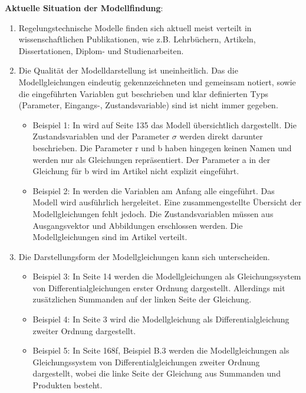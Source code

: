 \textbf{Aktuelle Situation der Modellfindung}: \\
\begin{enumerate}
	\item Regelungstechnische Modelle finden sich aktuell meist verteilt in wissenschaftlichen Publikationen, wie z.B. Lehrbüchern, Artikeln, Dissertationen, Diplom- und Studienarbeiten.
	\item Die Qualität der Modelldarstellung ist uneinheitlich. Das die Modellgleichungen eindeutig gekennzeichneten und gemeinsam notiert, sowie die eingeführten Variablen gut beschrieben und klar definierten Typs (Parameter, Eingangs-, Zustandsvariable) sind ist nicht immer gegeben.
	\begin{itemize}[label=$\bullet$]
		\item Beispiel 1: In \cite{LOR63} wird auf Seite 135 das Modell übersichtlich dargestellt. Die Zustandsvariablen und der Parameter $\sigma$ werden direkt darunter beschrieben. Die Parameter r und b haben hingegen keinen Namen und werden nur als Gleichungen repräsentiert. Der Parameter a in der Gleichung für b wird im Artikel nicht explizit eingeführt.
		\item Beispiel 2: In \cite{YIFREA09} werden die Variablen am Anfang alle eingeführt. Das Modell wird ausführlich hergeleitet. Eine zusammengestellte Übersicht der Modellgleichungen fehlt jedoch. Die Zustandsvariablen müssen aus Ausgangsvektor und Abbildungen erschlossen werden. Die Modellgleichungen sind im Artikel verteilt.
	\end{itemize}
	\item Die Darstellungsform der Modellgleichungen kann sich unterscheiden.
	\begin{itemize}[label=$\bullet$]
		\item Beispiel 3: In \cite{SILEEA12} Seite 14 werden die Modellgleichungen als Gleichungssystem von Differentialgleichungen erster Ordnung dargestellt. Allerdings mit zusätzlichen Summanden auf der linken Seite der Gleichung.
		\item Beispiel 4: In \cite{BUT21} Seite 3 wird die Modellgleichung als Differentialgleichung zweiter Ordnung dargestellt.
		\item Beispiel 5: In \cite{KNO16} Seite 168f, Beispiel B.3 werden die Modellgleichungen als Gleichungssystem von Differentialgleichungen zweiter Ordnung dargestellt, wobei die linke Seite der Gleichung aus Summanden und Produkten besteht.
	\end{itemize}

\end{enumerate}
